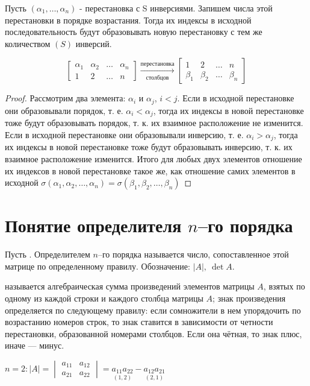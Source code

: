 \begin{lemma}
Пусть $(\alpha_1,\ldots,\alpha_n)$ - перестановка с S инверсиями. Запишем числа этой перестановки в порядке возрастания. Тогда их индексы в исходной последовательность будут образовывать новую перестановку с тем же количеством $(S)$ инверсий.
\end{lemma}
$$
\begin{bmatrix}
\alpha_1 & \alpha_2 & \ldots & \alpha_n \\
1        & 2        & \ldots & n
\end{bmatrix} \xrightarrow[\mbox{столбцов}]{\mbox{перестановка}}
\begin{bmatrix}
1       & 2       & \ldots & n       \\
\beta_1 & \beta_2 & \ldots & \beta_n
\end{bmatrix}
$$
\begin{proof}
Рассмотрим два элемента: $\alpha_i$ и $\alpha_j$, $i<j$. Если в исходной перестановке они образовывали порядок, т. е. $\alpha_i<\alpha_j$, тогда их индексы в новой перестановке тоже будут образовывать порядок, т. к. их взаимное расположение не изменится.
Если в исходной перестановке они образовывали инверсию, т. е. $\alpha_i>\alpha_j$, тогда их индексы в новой перестановке тоже будут образовывать инверсию, т. к. их взаимное расположение изменится.
Итого для любых двух элементов отношение их индексов в новой перестановке такое же, как отношение самих элементов в исходной \then $\sigma(\alpha_1,\alpha_2,\ldots,\alpha_n)=\sigma(\beta_1,\beta_2,\ldots,\beta_n)$
\end{proof}
\section{Понятие определителя $n$--го порядка}
Пусть . Определителем $n$--го порядка называется число, сопоставленное этой матрице по определенному правилу.
Обозначение: $|A|,\ \det A$.
\begin{opred}
 называется алгебраическая сумма произведений элементов матрицы $A$, взятых по одному из каждой строки и каждого столбца матрицы $A$; знак произведения определяется по следующему правилу: если сомножители в нем упорядочить по возрастанию номеров строк, то знак ставится в зависимости от четности перестановки, образованной номерами столбцов. Если она чётная, то знак плюс, иначе --- минус.
\end{opred}
$n=2: |A|=\begin{vmatrix} a_{11} & a_{12} \\ a_{21} & a_{22} \end{vmatrix}=\underset{(1,2)}{a_{11}a_{22}}-\underset{(2,1)}{a_{12}a_{21}}$


